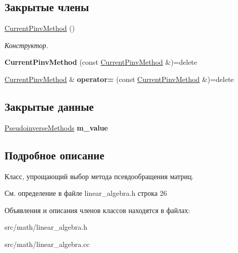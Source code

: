 \subsection*{Закрытые члены}
\begin{DoxyCompactItemize}
\item 
\hypertarget{class_math_1_1_lin_alg_1_1_current_pinv_method_a21292458d8909e25f2c38999de7f07c3}{}\label{class_math_1_1_lin_alg_1_1_current_pinv_method_a21292458d8909e25f2c38999de7f07c3} 
\hyperlink{class_math_1_1_lin_alg_1_1_current_pinv_method_a21292458d8909e25f2c38999de7f07c3}{Current\+Pinv\+Method} ()
\begin{DoxyCompactList}\small\item\em Конструктор. \end{DoxyCompactList}\item 
\hypertarget{class_math_1_1_lin_alg_1_1_current_pinv_method_a41e66230275afe98d7c7a14dcf98e466}{}\label{class_math_1_1_lin_alg_1_1_current_pinv_method_a41e66230275afe98d7c7a14dcf98e466} 
{\bfseries Current\+Pinv\+Method} (const \hyperlink{class_math_1_1_lin_alg_1_1_current_pinv_method}{Current\+Pinv\+Method} \&)=delete
\item 
\hypertarget{class_math_1_1_lin_alg_1_1_current_pinv_method_a1b176bac6635060313ad235ef366cb8b}{}\label{class_math_1_1_lin_alg_1_1_current_pinv_method_a1b176bac6635060313ad235ef366cb8b} 
\hyperlink{class_math_1_1_lin_alg_1_1_current_pinv_method}{Current\+Pinv\+Method} \& {\bfseries operator=} (const \hyperlink{class_math_1_1_lin_alg_1_1_current_pinv_method}{Current\+Pinv\+Method} \&)=delete
\end{DoxyCompactItemize}
\subsection*{Закрытые данные}
\begin{DoxyCompactItemize}
\item 
\hypertarget{class_math_1_1_lin_alg_1_1_current_pinv_method_a38f44a507f0ade147651055746b2010e}{}\label{class_math_1_1_lin_alg_1_1_current_pinv_method_a38f44a507f0ade147651055746b2010e} 
\hyperlink{namespace_math_1_1_lin_alg_a34ee452c5d64eeb10e1bb63cf887af17}{Pseudoinverse\+Methods} {\bfseries m\+\_\+value}
\end{DoxyCompactItemize}


\subsection{Подробное описание}
Класс, упрощающий выбор метода псевдообращения матриц. 

См. определение в файле linear\+\_\+algebra.\+h строка 26



Объявления и описания членов классов находятся в файлах\+:\begin{DoxyCompactItemize}
\item 
src/math/linear\+\_\+algebra.\+h\item 
src/math/linear\+\_\+algebra.\+cc\end{DoxyCompactItemize}
